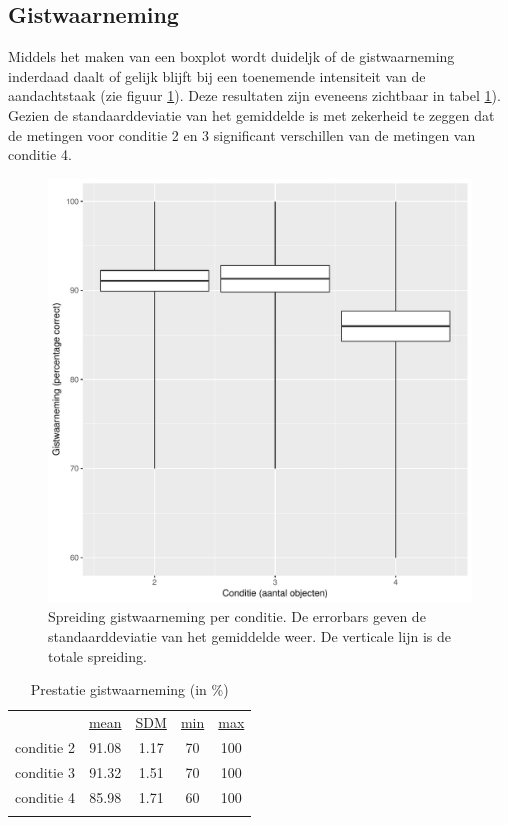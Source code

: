 \documentclass[a4paper,jou]{apa6}  %
\begin{document}
\subsection{Gistwaarneming}
Middels het maken van een boxplot wordt duideljk of de gistwaarneming inderdaad daalt of gelijk blijft bij een toenemende intensiteit van de aandachtstaak (zie figuur \ref{fig:boxplotGist}). Deze resultaten zijn eveneens zichtbaar in tabel \ref{tab:prestatieGist}). Gezien de standaarddeviatie van het gemiddelde is met zekerheid te zeggen dat de metingen voor conditie 2 en 3 significant verschillen van de metingen van conditie 4.
\begin{figure}
\centering
	\includegraphics[width=0.8\linewidth]{boxplotGist-conditie.pdf}
	\caption{\label{fig:boxplotGist}Spreiding gistwaarneming per conditie. De errorbars geven de standaarddeviatie van het gemiddelde weer. De verticale lijn is de totale spreiding.}
\end{figure}
\begin{table}
\caption{\label{tab:prestatieGist}Prestatie gistwaarneming (in \%)}
\begin{tabular}{c c c c c}\hline
\centering
	 &  \underline{mean}  & \underline{SDM} & \underline{min} & \underline{max}\\
	conditie 2 & 91.08 & 1.17 & 70 & 100\\
	conditie 3 & 91.32 & 1.51 & 70 & 100\\
	conditie 4 & 85.98 & 1.71 & 60 & 100\\
	\hline\\
\end{tabular}
\end{table}
\end{document}
